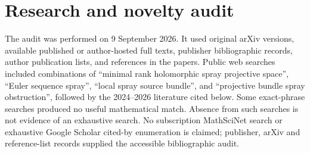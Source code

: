 \documentclass[12pt]{amsart}
\theoremstyle{definition}
\theoremstyle{remark}
\numberwithin{equation}{section}
\begin{document}
\section{Research and novelty audit}\label{en:audit}
The audit was performed on 9 September 2026. It used original arXiv versions, available published or author-hosted full texts, publisher bibliographic records, author publication lists, and references in the papers. Public web searches included combinations of ``minimal rank holomorphic spray projective space'', ``Euler sequence spray'', ``local spray source bundle'', and ``projective bundle spray obstruction'', followed by the 2024--2026 literature cited below. Some exact-phrase searches produced no useful mathematical match. Absence from such searches is not evidence of an exhaustive search. No subscription MathSciNet search or exhaustive Google Scholar cited-by enumeration is claimed; publisher, arXiv and reference-list records supplied the accessible bibliographic audit.
\end{document}
